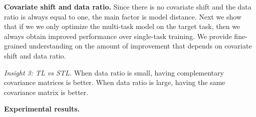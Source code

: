\smallskip
	\noindent\textbf{Covariate shift and data ratio.}
	Since there is no covariate shift and the data ratio is always equal to one, the main factor is model distance.
	Next we show that if we we only optimize the multi-task model on the target task, then we always obtain improved performance over single-task training.
	We provide fine-grained understanding on the amount of improvement that depends on covariate shift and data ratio.

	\textit{Insight 3: TL vs STL.} When data ratio is small, having complementary covariance matrices is better. When data ratio is large, having the same covariance matrix is better.

\smallskip
	\noindent\textbf{Experimental results.}


